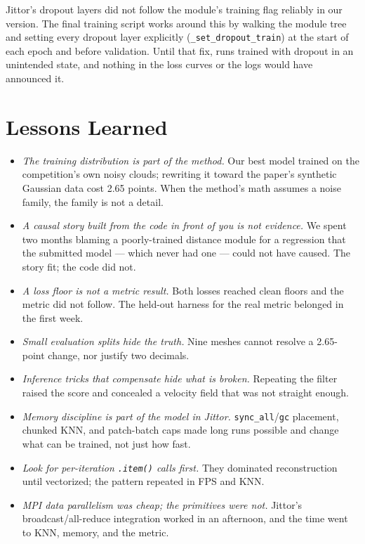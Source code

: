 \documentclass{article}
\begin{document}
Jittor's dropout layers did not follow the module's training flag reliably in our version. The final training script works around this by walking the module tree and setting every dropout layer explicitly (\texttt{\_set\_dropout\_train}) at the start of each epoch and before validation. Until that fix, runs trained with dropout in an unintended state, and nothing in the loss curves or the logs would have announced it.

\section{Lessons Learned}
\label{sec:lessons}

\begin{itemize}
  \item \emph{The training distribution is part of the method.} Our best model trained on the competition's own noisy clouds; rewriting it toward the paper's synthetic Gaussian data cost 2.65 points. When the method's math assumes a noise family, the family is not a detail.
  \item \emph{A causal story built from the code in front of you is not evidence.} We spent two months blaming a poorly-trained distance module for a regression that the submitted model --- which never had one --- could not have caused. The story fit; the code did not.
  \item \emph{A loss floor is not a metric result.} Both losses reached clean floors and the metric did not follow. The held-out harness for the real metric belonged in the first week.
  \item \emph{Small evaluation splits hide the truth.} Nine meshes cannot resolve a 2.65-point change, nor justify two decimals.
  \item \emph{Inference tricks that compensate hide what is broken.} Repeating the filter raised the score and concealed a velocity field that was not straight enough.
  \item \emph{Memory discipline is part of the model in Jittor.} \texttt{sync\_all}/\texttt{gc} placement, chunked KNN, and patch-batch caps made long runs possible and change what can be trained, not just how fast.
  \item \emph{Look for per-iteration \texttt{.item()} calls first.} They dominated reconstruction until vectorized; the pattern repeated in FPS and KNN.
  \item \emph{MPI data parallelism was cheap; the primitives were not.} Jittor's broadcast/all-reduce integration worked in an afternoon, and the time went to KNN, memory, and the metric.
\end{itemize}
\end{document}
